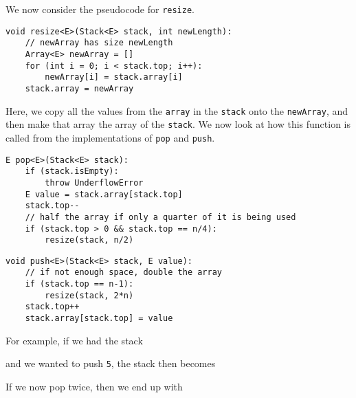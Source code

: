 \documentclass[a4paper, openany]{memoir}
\begin{document}
\noindent We now consider the pseudocode for \texttt{resize}.
\begin{lstlisting}[language=pseudocode]
void resize<E>(Stack<E> stack, int newLength):
    // newArray has size newLength
    Array<E> newArray = []
    for (int i = 0; i < stack.top; i++):
        newArray[i] = stack.array[i]
    stack.array = newArray
\end{lstlisting}
Here, we copy all the values from the \texttt{array} in the \texttt{stack} onto the \texttt{newArray}, and then make that array the array of the \texttt{stack}. We now look at how this function is called from the implementations of \texttt{pop} and \texttt{push}.
\begin{lstlisting}[language=pseudocode]
E pop<E>(Stack<E> stack):
    if (stack.isEmpty):
        throw UnderflowError
    E value = stack.array[stack.top]
    stack.top--
    // half the array if only a quarter of it is being used
    if (stack.top > 0 && stack.top == n/4):
        resize(stack, n/2)
\end{lstlisting}
\begin{lstlisting}[language=pseudocode]
void push<E>(Stack<E> stack, E value):
    // if not enough space, double the array
    if (stack.top == n-1):
        resize(stack, 2*n)
    stack.top++
    stack.array[stack.top] = value
\end{lstlisting}
For example, if we had the stack
\begin{center}
\end{center}
and we wanted to push \texttt{5}, the stack then becomes
\begin{center}
\end{center}
If we now pop twice, then we end up with
\begin{center}
\end{center}
\end{document}
